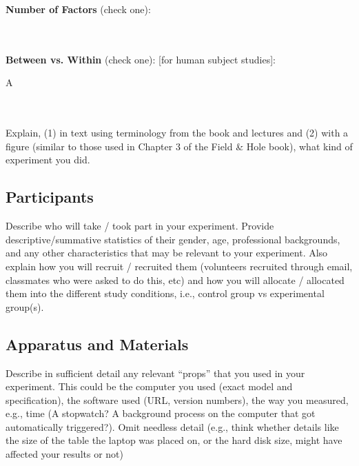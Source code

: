 \documentclass{article}
\begin{document}
\textbf{Number of Factors} (check one):\\
\noindent
\begin{minipage}{0.4\textwidth}
\end{minipage}%
\begin{minipage}{0.4\textwidth}
\end{minipage}%
\begin{minipage}{0.0\textwidth}
\end{minipage}\\\\

\textbf{Between vs. Within} (check one): [for human subject studies]:\\
\noindent
\begin{minipage}{0.4\textwidth}
\end{minipage}%
\begin{minipage}{0.4\textwidth}
    A
\end{minipage}%
\begin{minipage}{0.0\textwidth}
\end{minipage}\\\\
Explain, (1) in text using terminology from the book and lectures and (2) with a figure (similar to those used in Chapter 3 of the Field \& Hole book), what kind of experiment you did.

\subsection{Participants}
Describe who will take / took part in your experiment. Provide descriptive/summative statistics of their gender, age, professional backgrounds, and any other characteristics that may be relevant to your experiment. Also explain how you will recruit / recruited them (volunteers recruited through email, classmates who were asked to do this, etc) and how you will allocate / allocated them into the different study conditions, i.e., control group vs experimental group(s).


\subsection{Apparatus and Materials}
Describe in sufficient detail any relevant “props” that you used in your experiment. This could be the computer
you used (exact model and specification), the software used (URL, version numbers), the way you measured, e.g.,
time (A stopwatch? A background process on the computer that got automatically triggered?). Omit needless
detail (e.g., think whether details like the size of the table the laptop was placed on, or the hard disk size, might
have affected your results or not)
\end{document}
